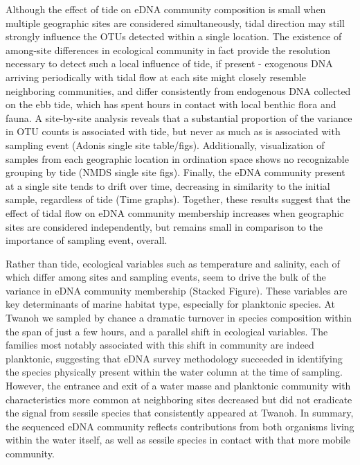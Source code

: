 \documentclass[fleqn,10pt,lineno]{wlpeerj} %
\begin{document}
Although the effect of tide on eDNA community composition is small when
multiple geographic sites are considered simultaneously, tidal direction
may still strongly influence the OTUs detected within a single location.
The existence of among-site differences in ecological community in fact
provide the resolution necessary to detect such a local influence of
tide, if present - exogenous DNA arriving periodically with tidal flow
at each site might closely resemble neighboring communities, and differ
consistently from endogenous DNA collected on the ebb tide, which has
spent hours in contact with local benthic flora and fauna. A
site-by-site analysis reveals that a substantial proportion of the
variance in OTU counts is associated with tide, but never as much as is
associated with sampling event (Adonis single site table/figs).
Additionally, visualization of samples from each geographic location in
ordination space shows no recognizable grouping by tide (NMDS single
site figs). Finally, the eDNA community present at a single site tends
to drift over time, decreasing in similarity to the initial sample,
regardless of tide (Time graphs). Together, these results suggest that
the effect of tidal flow on eDNA community membership increases when
geographic sites are considered independently, but remains small in
comparison to the importance of sampling event, overall.

Rather than tide, ecological variables such as temperature and salinity,
each of which differ among sites and sampling events, seem to drive the
bulk of the variance in eDNA community membership (Stacked Figure).
These variables are key determinants of marine habitat type, especially
for planktonic species. At Twanoh we sampled by chance a dramatic
turnover in species composition within the span of just a few hours, and
a parallel shift in ecological variables. The families most notably
associated with this shift in community are indeed planktonic,
suggesting that eDNA survey methodology succeeded in identifying the
species physically present within the water column at the time of
sampling. However, the entrance and exit of a water masse and planktonic
community with characteristics more common at neighboring sites
decreased but did not eradicate the signal from sessile species that
consistently appeared at Twanoh. In summary, the sequenced eDNA
community reflects contributions from both organisms living within the
water itself, as well as sessile species in contact with that more
mobile community.
\end{document}
